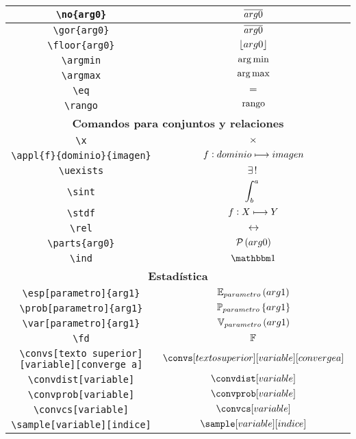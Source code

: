 \begin{longtable}{|c|c|}
\verb|\no{arg0}| & $\displaystyle\overline{arg0}$ \\ \hline 
\verb|\gor{arg0}| & $\displaystyle\overline{arg0}$ \\ \hline 
\verb|\floor{arg0}| & $\displaystyle\left\lfloor arg0 \right\rfloor$ \\ \hline 
\verb|\argmin| & $\displaystyle\operatorname*{arg\,min}$ \\ \hline 
\verb|\argmax| & $\displaystyle\operatorname*{arg\,max}$ \\ \hline 
\verb|\eq| & $\displaystyle=$ \\ \hline 
\verb|\rango| & $\displaystyle\operatorname{rango}$ \\ \hline 
\multicolumn{2}{|c|}{\textbf{Comandos para conjuntos y relaciones}} \\ \hline 
\verb|\x| & $\displaystyle\times$ \\ \hline 
\verb|\appl{f}{dominio}{imagen}| & $\displaystyle f : dominio\longmapsto imagen$ \\ \hline 
\verb|\uexists| & $\displaystyle\exists\, !\;$ \\ \hline 
\verb|\sint| & $\displaystyle\int_b^a\;$ \\ \hline 
\verb|\stdf| & $\displaystyle f : X\longmapsto Y$ \\ \hline 
\verb|\rel| & $\displaystyle\rel$ \\ \hline 
\verb|\parts{arg0}| & $\displaystyle\mathcal{P}\left(arg0\right)$ \\ \hline 
\verb|\ind| & $\displaystyle\ind$ \\ \hline 
\multicolumn{2}{|c|}{\textbf{Estadística}} \\ \hline 
\verb|\esp[parametro]{arg1}| & $\displaystyle\esp[parametro]{arg1}$ \\ \hline 
\verb|\prob[parametro]{arg1}| & $\displaystyle\prob[parametro]{arg1}$ \\ \hline 
\verb|\var[parametro]{arg1}| & $\displaystyle\var[parametro]{arg1}$ \\ \hline 
\verb|\fd| & $\displaystyle\mathbb{F}$ \\ \hline 
\verb|\convs[texto superior][variable][converge a]| & $\displaystyle\convs[texto superior][variable][converge a]$ \\ \hline 
\verb|\convdist[variable]| & $\displaystyle\convdist[variable]$ \\ \hline 
\verb|\convprob[variable]| & $\displaystyle\convprob[variable]$ \\ \hline 
\verb|\convcs[variable]| & $\displaystyle\convcs[variable]$ \\ \hline 
\verb|\sample[variable][indice]| & $\displaystyle\sample[variable][indice]$ \\ \hline 

\end{longtable}
